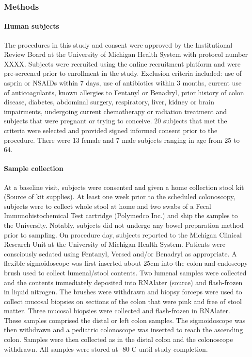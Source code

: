 \documentclass[11pt,]{article}
\let\oldparagraph\paragraph
\renewcommand{\paragraph}[1]{\oldparagraph{#1}\mbox{}}
\begin{document}
\subsubsection{Methods}\label{methods}

\paragraph{Human subjects}\label{human-subjects}

The procedures in this study and consent were approved by the
Institutional Review Board at the University of Michigan Health System
with protocol number XXXX. Subjects were recruited using the online
recruitment platform and were pre-screened prior to enrollment in the
study. Exclusion criteria included: use of asprin or NSAIDs within 7
days, use of antibiotics within 3 months, current use of anticoagulants,
known allergies to Fentanyl or Benadryl, prior history of colon disease,
diabetes, abdominal surgery, respiratory, liver, kidney or brain
impairments, undergoing current chemotherapy or radiation treatment and
subjects that were pregnant or trying to conceive. 20 subjects that met
the criteria were selected and provided signed informed consent prior to
the procedure. There were 13 female and 7 male subjects ranging in age
from 25 to 64.

\paragraph{Sample collection}\label{sample-collection}

At a baseline visit, subjects were consented and given a home collection
stool kit (Source of kit supplies). At least one week prior to the
scheduled colonoscopy, subjects were to collect whole stool at home and
two swabs of a Fecal Immunohistochemical Test cartridge (Polymedco Inc.)
and ship the samples to the University. Notably, subjects did not
undergo any bowel preparation method prior to sampling. On procedure
day, subjects reported to the Michigan Clinical Research Unit at the
University of Michigan Health System. Patients were consciously sedated
using Fentanyl, Versed and/or Benadryl as appropriate. A flexible
sigmoidoscope was first inserted about 25cm into the colon and endoscopy
brush used to collect lumenal/stool contents. Two lumenal samples were
collected and the contents immediately deposited into RNAlater (source)
and flash-frozen in liquid nitrogen. The brushes were withdrawn and
biopsy forceps were used to collect mucosal biopsies on sections of the
colon that were pink and free of stool matter. Three mucosal biopsies
were collected and flash-frozen in RNAlater. These samples comprised the
distal or left colon samples. The sigmoidoscope was then withdrawn and a
pediatric colonoscope was inserted to reach the ascending colon. Samples
were then collected as in the distal colon and the colonoscope
withdrawn. All samples were stored at -80 C until study completion.
\end{document}
